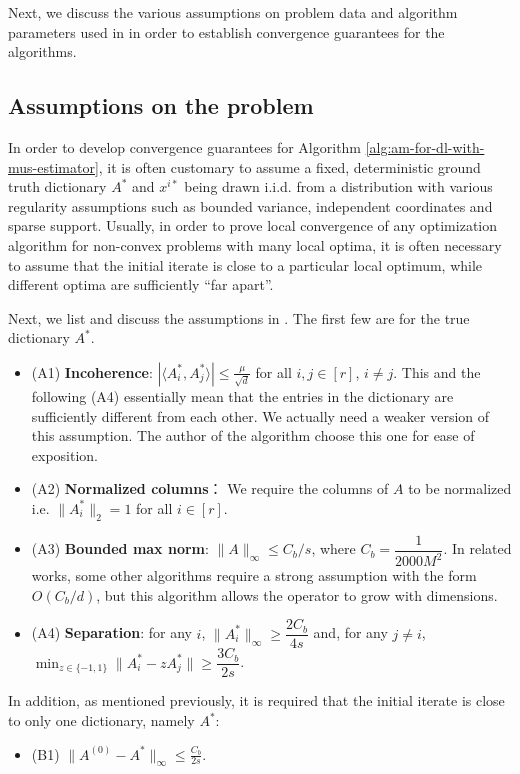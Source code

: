 Next, we discuss the various assumptions on problem data and algorithm parameters used in \cite{chatterji2017alternating} in order to establish convergence guarantees for the algorithms.

\subsection{Assumptions on the problem} 

In order to develop convergence guarantees for Algorithm \ref{alg:am-for-dl-with-mus-estimator}, it is often customary to assume a fixed, deterministic ground truth dictionary $A^*$ and $x^{i*}$ being drawn i.i.d. from a distribution with various regularity assumptions such as bounded variance, independent coordinates and sparse support. Usually, in order to prove local convergence of any optimization algorithm for non-convex problems with many local optima, it is often necessary to assume that the initial iterate is close to a particular local optimum, while different optima are sufficiently ``far apart''.

Next, we list and discuss the assumptions in \cite{chatterji2017alternating}. The first few are for the true dictionary $A^*$. 
\begin{itemize}
    \item (A1) \textbf{Incoherence}: $\left| \langle A_i^*, A_j^*\rangle \right| \leq \frac{\mu}{\sqrt{d}} $ for all $i,j\in [r]$, $i\neq j$.  This and the following (A4) essentially mean that the entries in the dictionary are sufficiently different from each other. We actually need a weaker version of this assumption. The author of the algorithm choose this one for ease of exposition.
    \item (A2) \textbf{Normalized columns}： We require the columns of $A$ to be normalized i.e. $\|A_i^*\|_2=1$ for all $i\in [r]$. 
    \item (A3) \textbf{Bounded max norm}: $\|A\|_\infty \leq C_b/s$, where $C_b = \dfrac{1}{2000 M^2}$. In related works, some other algorithms require a strong assumption with the form $O(C_b/d)$, but this algorithm allows the operator to grow with dimensions.
    \item (A4) \textbf{Separation}: for any $i$, $\|A_i^*\|_\infty \geq \dfrac{2C_b}{4s}$ 
    and, for any $j\neq i$, $\min_{z\in \{-1, 1\}} \|A_i^* - z A^*_j\|\geq \dfrac{3C_b}{2s}$.
\end{itemize}

In addition, as mentioned previously, it is required that the initial iterate is close to only one dictionary, namely $A^*$:
\begin{itemize}
    \item (B1) $\|A^{(0)} - A^*\|_\infty \leq \frac{C_b}{2s}$. 
\end{itemize}

